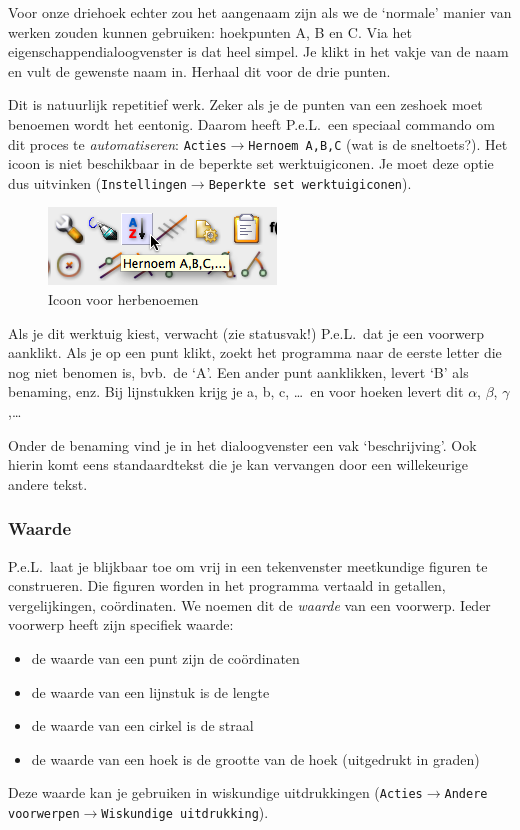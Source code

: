 Voor onze driehoek echter zou het aangenaam zijn als we de `normale' manier van werken zouden kunnen gebruiken: hoekpunten A, B en C. Via het eigenschappendialoogvenster is dat heel simpel. Je klikt in het vakje van de naam en vult de gewenste naam in. Herhaal dit voor de drie punten.

Dit is natuurlijk repetitief werk. Zeker als je de punten van een zeshoek moet benoemen wordt het eentonig. Daarom heeft P.e.L.\ een speciaal commando om dit proces te \emph{automatiseren}: \texttt{Acties$\rightarrow$Hernoem A,B,C} (wat is de sneltoets?).  Het icoon is  niet beschikbaar in de beperkte set werktuigiconen. Je moet deze optie dus uitvinken (\texttt{Instellingen$\rightarrow$Beperkte set werktuigiconen}).
\begin{figure}[htb]
    \centering
    \includegraphics[]{figuren/PeL/herbenoemABC.png}
       \caption{Icoon voor herbenoemen}
    \label{fig:herbenoemicoon}
\end{figure}
Als je dit werktuig kiest, verwacht (zie statusvak!) P.e.L.\ dat je een voorwerp aanklikt. Als je op een punt klikt, zoekt het programma naar de eerste letter die nog niet benomen is, bvb.\ de `A'. Een ander punt aanklikken, levert `B' als benaming, enz. Bij lijnstukken krijg je a, b, c, \dots\ en voor hoeken levert dit $\alpha$, $\beta$, $\gamma$,\dots

Onder de benaming vind je in het dialoogvenster een vak `beschrijving'. Ook hierin komt eens standaardtekst die je kan vervangen door een willekeurige andere tekst. 

\subsubsection{Waarde}
P.e.L.\ laat je blijkbaar toe om vrij in een tekenvenster meetkundige figuren te construeren. Die figuren worden in het programma vertaald in getallen, vergelijkingen, co\"{o}rdinaten. We noemen dit de \emph{waarde} van een voorwerp. Ieder voorwerp heeft zijn specifiek waarde:
\begin{itemize}
\item de waarde van een punt zijn de co\"ordinaten
\item de waarde van een lijnstuk is de lengte
\item de waarde van een cirkel is de  straal
\item de waarde van een hoek is de grootte van de hoek (uitgedrukt in graden)
\end{itemize}
Deze waarde kan je gebruiken in wiskundige uitdrukkingen (\texttt{Acties$\rightarrow$Andere voorwerpen$\rightarrow$Wiskundige uitdrukking}).

